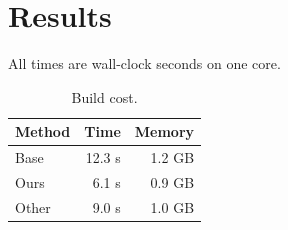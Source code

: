 \documentclass{article}\usepackage{booktabs}
\begin{document}
\section{Results}
All times are wall-clock seconds on one core.
\begin{table}[h]\centering\caption{Build cost.}\label{tab:a}
\begin{tabular}{lrr}
\toprule
Method & Time & Memory \\
\midrule
Base & 12.3 s & 1.2 GB \\
Ours & 6.1 s & 0.9 GB \\
Other & 9.0 s & 1.0 GB \\
\bottomrule
\end{tabular}\end{table}
\end{document}
